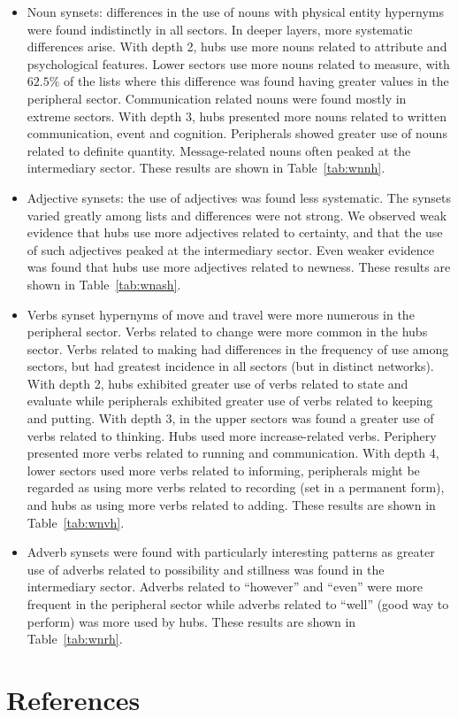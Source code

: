 \documentclass[review]{elsarticle}
\begin{document}
\begin{itemize}
\item Noun synsets: differences in the use of nouns with physical entity hypernyms were found indistinctly in all sectors.
In deeper layers, more systematic differences arise.
With depth 2, hubs use more nouns related to attribute and psychological features.
Lower sectors use more nouns related to measure,
with $62.5\%$ of the lists where this difference was found having greater values in the peripheral sector.
Communication related nouns were found mostly in extreme sectors.
With depth 3, hubs presented more nouns related to written communication, event and cognition.
Peripherals showed greater use of nouns related to definite quantity.
Message-related nouns often peaked at the intermediary sector.
These results are shown in Table~\ref{tab:wnnh}.

\FloatBarrier
\item Adjective synsets: the use of adjectives was found less systematic.
The synsets varied greatly among lists and differences were not strong.
We observed weak evidence that hubs use more adjectives related to certainty,
and that the use of such adjectives peaked at the intermediary sector.
Even weaker evidence was found that hubs use more adjectives related to newness.
These results are shown in Table~\ref{tab:wnash}.

\FloatBarrier
\item Verbs synset hypernyms of move and travel were more numerous in the peripheral sector.
Verbs related to change were more common in the hubs sector.
Verbs related to making had differences in the frequency of use among sectors,
but had greatest incidence in all sectors (but in distinct networks).
With depth 2, hubs exhibited greater use of verbs related to state and evaluate while
peripherals exhibited greater use of verbs related to keeping and putting.
With depth 3, in the upper sectors was found a greater use of verbs related to thinking.
Hubs used more increase-related verbs.
Periphery presented more verbs related to running and communication.
With depth 4, lower sectors used more verbs related to informing, peripherals might be regarded as using more verbs related to recording (set in a permanent form), and hubs as using more verbs related to adding.
These results are shown in Table~\ref{tab:wnvh}.

\FloatBarrier
\item Adverb synsets were found with particularly interesting patterns as greater use of adverbs related to possibility and stillness was found in the intermediary sector.
Adverbs related to ``however'' and ``even'' were more frequent in the peripheral sector while adverbs related to ``well'' (good way to perform) was more used by hubs.
These results are shown in Table~\ref{tab:wnrh}.

\FloatBarrier
\end{itemize}

\section*{References}


\end{document}
